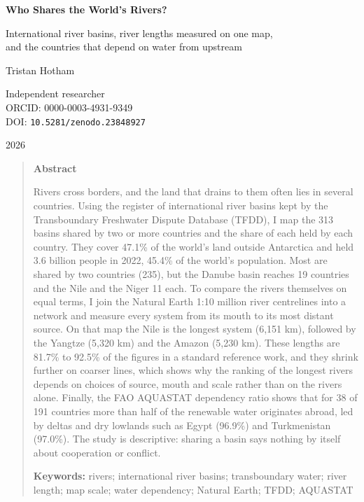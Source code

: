 \documentclass[11pt,a4paper]{article}
\begin{document}
\begin{center}
{\Large\bfseries Who Shares the World's Rivers?\par}
\vspace{0.4em}
{\large International river basins, river lengths measured on one map,\\and the countries that depend on water from upstream\par}
\vspace{1.2em}
{\large Tristan Hotham\par}
\vspace{0.3em}
{\small Independent researcher\\
ORCID: 0000-0003-4931-9349\\
DOI: \texttt{10.5281/zenodo.23848927}\par}
\vspace{0.8em}
2026
\end{center}

\begin{quote}
\small
\begin{center}\textbf{Abstract}\end{center}
Rivers cross borders, and the land that drains to them often lies in several countries. Using the register of international river basins kept by the Transboundary Freshwater Dispute Database (TFDD), I map the 313 basins shared by two or more countries and the share of each held by each country. They cover 47.1\% of the world's land outside Antarctica and held 3.6 billion people in 2022, 45.4\% of the world's population. Most are shared by two countries (235), but the Danube basin reaches 19 countries and the Nile and the Niger 11 each. To compare the rivers themselves on equal terms, I join the Natural Earth 1:10 million river centrelines into a network and measure every system from its mouth to its most distant source. On that map the Nile is the longest system (6,151 km), followed by the Yangtze (5,320 km) and the Amazon (5,230 km). These lengths are 81.7\% to 92.5\% of the figures in a standard reference work, and they shrink further on coarser lines, which shows why the ranking of the longest rivers depends on choices of source, mouth and scale rather than on the rivers alone. Finally, the FAO AQUASTAT dependency ratio shows that for 38 of 191 countries more than half of the renewable water originates abroad, led by deltas and dry lowlands such as Egypt (96.9\%) and Turkmenistan (97.0\%). The study is descriptive: sharing a basin says nothing by itself about cooperation or conflict.

\textbf{Keywords:} rivers; international river basins; transboundary water; river length; map scale; water dependency; Natural Earth; TFDD; AQUASTAT
\end{quote}
\end{document}
